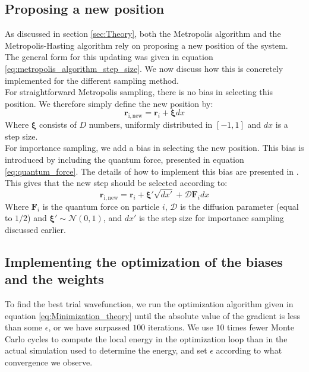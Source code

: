 \documentclass[a4paper, 10pt]{article}
\begin{document}
	\subsection{Proposing a new position}\label{sec:met_propose_new_position}
	As discussed in section \ref{sec:Theory}, both the Metropolis algorithm and the Metropolis-Hasting algorithm rely on proposing a new position of the system. The general form for this updating was given in equation \ref{eq:metropolis_algorithm_step_size}. We now discuss how this is concretely implemented for the different sampling method.\\
	\linebreak
	For straightforward Metropolis sampling, there is no bias in selecting this position. We therefore simply define the new position by:
	\begin{equation}
	\boldsymbol{r}_{\mathrm{i,new}}=\boldsymbol{r}_i+\boldsymbol{\xi}dx
	\end{equation}
	Where $\boldsymbol{\xi}$ consists of $D$ numbers, uniformly distributed in $[-1,1]$ and $dx$ is a step size.\\
	\linebreak
	For importance sampling, we add a bias in selecting the new position. This bias is introduced by including the quantum force, presented in equation \ref{eq:quantum_force}. The details of how to implement this bias are presented in \cite{Hjorth-Jensen2015}. This gives that the new step should be selected according to:
	\begin{equation}
	\boldsymbol{r}_{\mathrm{i,new}}=\boldsymbol{r}_i+\boldsymbol{\xi'}\sqrt{dx'}+\mathcal{D}\boldsymbol{F}_i dx
	\end{equation}
	Where $\boldsymbol{F}_i$ is the quantum force on particle $i$, $\mathcal{D}$ is the diffusion parameter (equal to $1/2$) and $\boldsymbol{\xi'}\sim \mathcal{N}(0,1)$, and $dx'$ is the step size for importance sampling discussed earlier.
	\subsection{Implementing the optimization of the biases and the weights}
	To find the best trial wavefunction, we run the optimization algorithm given in equation \ref{eq:Minimization_theory} until the absolute value of the gradient is less than some $\epsilon$, or we have surpassed $100$ iterations. We use $10$ times fewer Monte Carlo cycles to compute the local energy in the optimization loop than in the actual simulation used to determine the energy, and set $\epsilon$ according to what convergence we observe.
\end{document}

